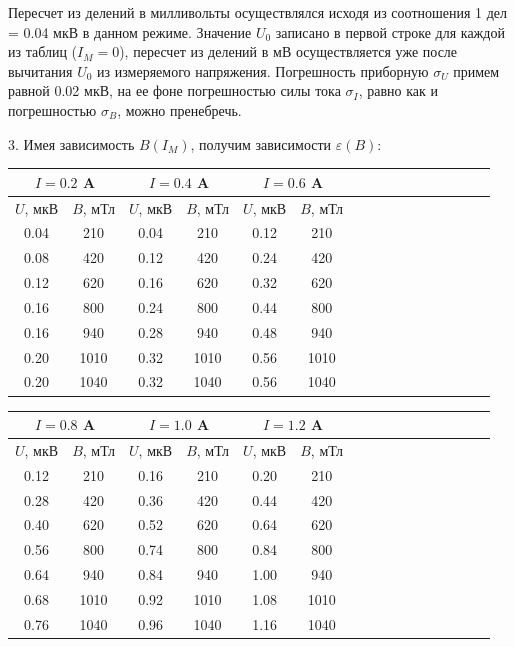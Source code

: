 \documentclass[14pt]{article}
\begin{document}
\vspace{1cm}
Пересчет из делений в милливольты осуществлялся исходя из соотношения 1 дел = 0.04 мкВ в данном режиме. Значение $U_0$ записано в первой строке для каждой из таблиц ($I_M = 0$), пересчет из делений в мВ осуществляется уже после вычитания $U_0$ из измеряемого напряжения. Погрешность приборную $\sigma_U$ примем равной 0.02 мкВ, на ее фоне погрешностью силы тока $\sigma_I$, равно как и погрешностью $\sigma_B$, можно пренебречь. 


3. Имея зависимость $B(I_M)$, получим зависимости $\varepsilon(B)$:

\begin{center}
\begin{tabular}{|c|c|c|c|c|c|c|c|c|c|c|c|c|c|c|c|}
\hline
\multicolumn{2}{|c|}{$I = 0.2$ A}			&	\multicolumn{2}{|c|}{$I = 0.4$ A}			&	\multicolumn{2}{|c|}{$I = 0.6$ A}			\\
\hline
$U$, мкВ	&	$B$, мТл					&	$U$, мкВ	&	$B$, мТл					&	$U$, мкВ	&	$B$, мТл					\\
\hline
0.04		&	210							&	0.04		&	210							&	0.12		&	210							\\
\hline
0.08		&	420							&	0.12		&	420							&	0.24		&	420							\\
\hline
0.12		&	620							&	0.16		&	620							&	0.32		&	620							\\
\hline
0.16		&	800							&	0.24		&	800							&	0.44		&	800							\\
\hline
0.16		&	940							&	0.28		&	940							&	0.48		&	940 						\\
\hline
0.20		&	1010						&	0.32		&	1010						&	0.56		&	1010						\\
\hline
0.20		&	1040						&	0.32		&	1040						&	0.56		&	1040						\\
\hline
\end{tabular}
\end{center}

\begin{center}
\begin{tabular}{|c|c|c|c|c|c|c|c|c|c|c|c|c|c|c|c|}
\hline
\multicolumn{2}{|c|}{$I = 0.8$ A}			&	\multicolumn{2}{|c|}{$I = 1.0$ A}			&	\multicolumn{2}{|c|}{$I = 1.2$ A}			\\
\hline
$U$, мкВ	&	$B$, мТл					&	$U$, мкВ	&	$B$, мТл					&	$U$, мкВ	&	$B$, мТл					\\
\hline
0.12		&	210							&	0.16		&	210							&	0.20		&	210							\\
\hline
0.28		&	420							&	0.36		&	420							&	0.44		&	420							\\
\hline
0.40		&	620							&	0.52		&	620							&	0.64		&	620							\\
\hline
0.56		&	800							&	0.74		&	800							&	0.84		&	800							\\
\hline
0.64		&	940							&	0.84		&	940							&	1.00		&	940 						\\
\hline
0.68		&	1010						&	0.92		&	1010						&	1.08		&	1010						\\
\hline
0.76		&	1040						&	0.96		&	1040						&	1.16		&	1040						\\
\hline
\end{tabular}
\end{center}
\end{document}
